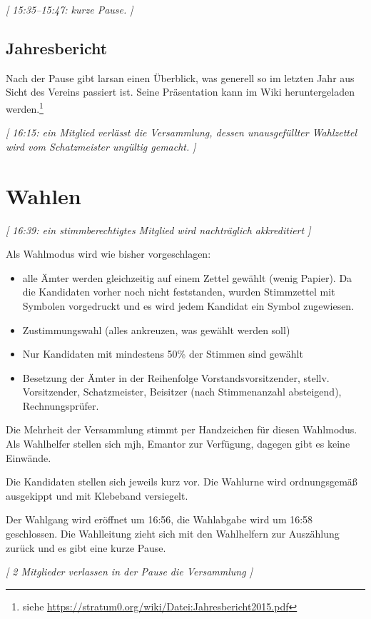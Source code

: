 \documentclass[a4paper,12pt]{scrartcl}
\begin{document}
\emph{[ 15:35--15:47: kurze Pause. ]}

\subsection{Jahresbericht}
Nach der Pause gibt larsan einen Überblick, was generell so im letzten Jahr aus
Sicht des Vereins passiert ist. Seine Präsentation kann im Wiki heruntergeladen
werden.\footnote{siehe
\url{https://stratum0.org/wiki/Datei:Jahresbericht2015.pdf}}

\emph{[ 16:15: ein Mitglied verlässt die Versammlung, dessen unausgefüllter
Wahlzettel wird vom Schatzmeister ungültig gemacht. ]}



\section{Wahlen}
\emph{[ 16:39: ein stimmberechtigtes Mitglied wird nachträglich akkreditiert ]}

Als Wahlmodus wird wie bisher vorgeschlagen:
\begin{itemize}
  \item alle Ämter werden gleichzeitig auf einem Zettel gewählt (wenig Papier).
  Da die Kandidaten vorher noch nicht feststanden, wurden Stimmzettel mit
  Symbolen vorgedruckt und es wird jedem Kandidat ein Symbol zugewiesen.
  \item Zustimmungswahl (alles ankreuzen, was gewählt werden soll)
  \item Nur Kandidaten mit mindestens 50\% der Stimmen sind gewählt
  \item Besetzung der Ämter in der Reihenfolge Vorstandsvorsitzender, stellv.
    Vorsitzender, Schatzmeister, Beisitzer (nach Stimmenanzahl absteigend),
    Rechnungsprüfer.
\end{itemize}

Die Mehrheit der Versammlung stimmt per Handzeichen für diesen Wahlmodus. Als
Wahlhelfer stellen sich mjh, Emantor zur Verfügung, dagegen gibt es keine
Einwände.

Die Kandidaten stellen sich jeweils kurz vor. Die Wahlurne wird ordnungsgemäß
ausgekippt und mit Klebeband versiegelt.

Der Wahlgang wird eröffnet um 16:56, die Wahlabgabe wird um 16:58 geschlossen.
Die Wahlleitung zieht sich mit den Wahlhelfern zur Auszählung zurück und es gibt
eine kurze Pause.

\emph{[ 2 Mitglieder verlassen in der Pause die Versammlung ]}
\end{document}
